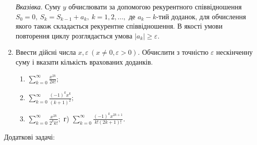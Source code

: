\documentclass[]{article}
\makeatletter
\newcommand{\xslalph}[1]{\expandafter\@xslalph\csname c@#1\endcsname}
\newcommand{\@xslalph}[1]{%
    \ifcase#1\or а\or б\or в\or г\or д\or e\or є\or ж\or з\or i%
    \or й\or к\or л\or м\or н\or о\or п\or р\or с\or т%
    \or у\or ф\or х\or ц\or ч\or ш\or ю\or я\or аа\or бб\or вв%
    \else\@ctrerr\fi%
}
\makeatother
\begin{document}
\begin{enumerate}
\begin{enumerate}[label=\xslalph*)]
\end{enumerate}

\emph{\emph{Вказівка}}. Суму $y$ обчислювати за допомогою
рекурентного співвідношення
\(S_{0} = 0,\ S_{k} = S_{k - 1} + a_{k},\ k = 1,2,\ldots,\) де
\(a_{k} - k\)-тий доданок, для обчислення якого також складається
рекурентне співвідношення. В якості умови повторення циклу розглядається
умова \(\left| a_{k} \right| \geq \varepsilon.\)

\item
  Ввести дійсні числа
  \(x,\varepsilon\ (x \neq 0,\varepsilon > 0)\)\emph{.} Обчислити з
  точністю \(\varepsilon\) нескінченну суму і вказати кількість
  врахованих доданків.
\begin{enumerate}[label=\xslalph*)]
\item \(\sum_{k = 0}^{\infty}\frac{x^{2k}}{2k!};\) 
\item \(\sum_{k = 0}^{\infty}\frac{( - 1)^{k}x^{k}}{(k + 1)^{2}};\)
\item \(\sum_{k = 0}^{\infty}\frac{x^{2k}}{2^{k}k!};\) г)
\(\sum_{k = 0}^{\infty}\frac{( - 1)^{k}x^{2k + 1}}{k!(2k + 1)!}.\)
\end{enumerate}

\end{enumerate}

Додаткові задачі:
\end{document}
